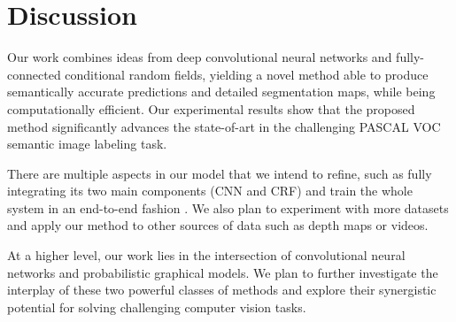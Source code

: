 \section{Discussion}
\label{sec:discussion}

Our work combines ideas from deep convolutional neural networks and
fully-connected conditional random fields, yielding a novel method able to
produce semantically accurate predictions and detailed segmentation maps,
while being computationally efficient. Our experimental results show that the
proposed method significantly advances the state-of-art in the challenging
PASCAL VOC semantic image labeling task.

There are multiple aspects in our model that we intend to refine, such as
fully integrating its two main components (CNN and CRF) and train the whole
system in an end-to-end fashion \citep{chen2014learning}. We also plan to experiment with more datasets
and apply our method to other sources of data such as depth maps or videos.

At a higher level, our work lies in the intersection of convolutional neural
networks and probabilistic graphical models. We plan to further investigate
the interplay of these two powerful classes of methods and explore their
synergistic potential for solving challenging computer vision tasks.
